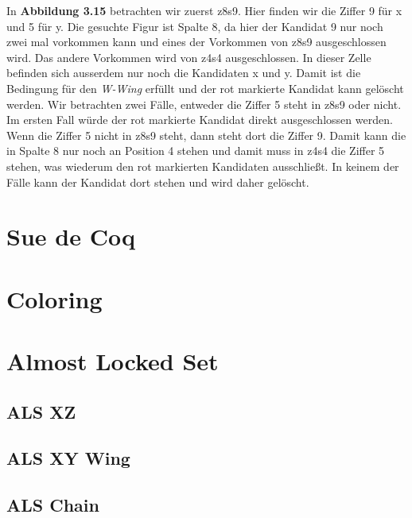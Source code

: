 \documentclass[accentcolor=tud6b,11pt,paper=a4]{tudreport}
\begin{document}
In \textbf{Abbildung 3.15} betrachten wir zuerst z8s9. Hier finden wir die Ziffer 9 für x und 5 für y. Die gesuchte Figur ist Spalte 8, da hier der Kandidat 9 nur noch zwei mal vorkommen kann und eines der Vorkommen von z8s9 ausgeschlossen wird.
Das andere Vorkommen wird von z4s4 ausgeschlossen. In dieser Zelle befinden sich ausserdem nur noch die Kandidaten x und y. Damit ist die Bedingung für den \textit{W-Wing} erfüllt und der rot markierte Kandidat kann gelöscht werden. Wir betrachten zwei Fälle, entweder die Ziffer 5 steht in z8s9 oder nicht. Im ersten Fall würde der rot markierte Kandidat direkt ausgeschlossen werden. Wenn die Ziffer 5 nicht in z8s9 steht, dann steht dort die Ziffer 9. Damit kann die in Spalte 8 nur noch an Position 4 stehen und damit muss in z4s4 die Ziffer 5 stehen, was wiederum den rot markierten Kandidaten ausschließt. In keinem der Fälle kann der Kandidat dort stehen und wird daher gelöscht.
\newpage
\section{Sue de Coq}

\newpage
\section{Coloring}

\newpage
\section{Almost Locked Set}

\newpage
\subsection{ALS XZ}

\newpage
\subsection{ALS XY Wing}

\newpage
\subsection{ALS Chain}

\end{document}
